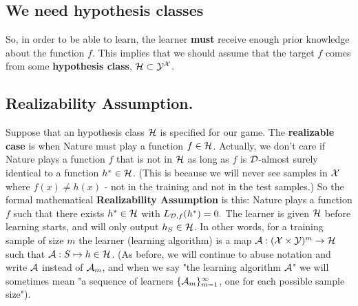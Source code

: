 {%


\subsection{We need hypothesis classes}

So, in order to be able to learn, the learner {\bf must} receive enough prior knowledge about the function $f$.
This implies that we should assume that the target $f$ comes from some \textbf{hypothesis class}, $\mathcal{H} \subset \mathcal{Y} ^{\mathcal{X}}$. 

\subsection{Realizability Assumption.} Suppose that an hypothesis class $\mathcal{H}$ is specified for our game. The {\bf realizable case} is when Nature must play a function $f\in\mathcal{H}$. Actually, we don't care if Nature plays a function $f$ that is not in $\mathcal{H}$ as long as $f$ is $\mathcal{D}$-almost surely identical to a function $h^*\in\mathcal{H}$.  (This is because we will never see samples in $\mathcal{X}$ where $f(x)\neq h(x)$ - not in the training and not in the test samples.) So the formal mathematical {\bf Realizability Assumption} is this: Nature plays a function $f$ such that there exists $h^*\in\mathcal{H}$ with $L_{\mathcal{D},f}(h^*)=0.$
\vspace{3mm}
The learner is given $\mathcal{H}$ before learning starts, and will only output $h_S\in\mathcal{H}$. In other words, for a training sample of size $m$ the learner (learning algorithm) is a map $\mathcal{A}:(\mathcal{X}\times\mathcal{Y})^m\to\mathcal{H}$ such that $\mathcal{A}:S\mapsto h\in\mathcal{H}$. (As before, we will continue to abuse notation and write $\mathcal{A}$ instead of $\mathcal{A}_m$, and when we say "the learning algorithm $\mathcal{A}$" we will sometimes mean "a sequence of learners $\{\mathcal{A}_m\}_{m=1}^\infty$, one for each possible sample size").

}
